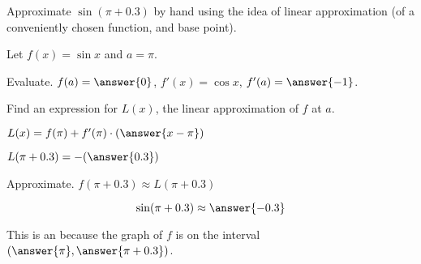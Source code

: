 \documentclass{ximera}
\author{Steven Gubkin\and Nela Lakos \and Bobby Ramsey}
\begin{document}
\begin{exercise}
Approximate $\sin(\pi+0.3)$ by hand using the idea of linear
approximation (of a conveniently chosen function, and base point).
\begin{hint}
Let $f(x)=\sin{x}$ and $a=\pi$.
\end{hint}
\begin{hint}
Evaluate.
 $f(a)=\answer{0}$,
 $f'(x)=\cos{x}$,
  $f'(a)=\answer{-1}$.
\end{hint}
\begin{hint}
Find an expression for $L(x)$, the linear approximation of $f$ at $a$.
\end{hint}
\begin{hint}
 $L(x)=f(\pi)+f'(\pi)\cdot(\answer{x-\pi})$
\end{hint}
\begin{hint}
 $L(\pi+0.3)=-(\answer{0.3})$
\end{hint}
\begin{hint}
Approximate. 
 $f(\pi+0.3)\approx L(\pi+0.3)$
\end{hint}
\begin{prompt}
	$$\sin(\pi+0.3) \approx \answer{-0.3}$$
\end{prompt}

This is an
because the graph of $f$ is 
on the interval $\left( \answer{\pi}, \answer{\pi + 0.3} \right)$.

\end{exercise}
\end{document}
